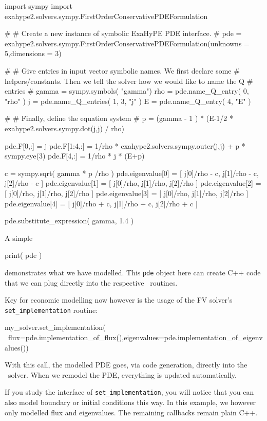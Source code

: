 \begin{code}
import sympy
import exahype2.solvers.sympy.FirstOrderConservativePDEFormulation


#
# Create a new instance of symbolic ExaHyPE PDE interface.
#
pde = exahype2.solvers.sympy.FirstOrderConservativePDEFormulation(unknowns = 5,dimensions = 3)

#
# Give entries in input vector symbolic names. We first declare some
# helpers/constants. Then we tell the solver how we would like to name the Q 
# entries
#
gamma = sympy.symbols( "gamma")
rho   = pde.name_Q_entry( 0, "rho" )
j     = pde.name_Q_entries( 1, 3, "j" )
E     = pde.name_Q_entry( 4, "E" )

#
# Finally, define the equation system
#
p = (gamma - 1 ) * (E-1/2 * exahype2.solvers.sympy.dot(j,j) / rho)

pde.F[0,:]   = j
pde.F[1:4,:] = 1/rho * exahype2.solvers.sympy.outer(j,j) + p * sympy.eye(3)
pde.F[4,:]   = 1/rho * j * (E+p)

c = sympy.sqrt( gamma * p /rho )
pde.eigenvalue[0] = [ j[0]/rho - c, j[1]/rho - c, j[2]/rho - c ]
pde.eigenvalue[1] = [ j[0]/rho, j[1]/rho, j[2]/rho ]
pde.eigenvalue[2] = [ j[0]/rho, j[1]/rho, j[2]/rho ]
pde.eigenvalue[3] = [ j[0]/rho, j[1]/rho, j[2]/rho ]
pde.eigenvalue[4] = [ j[0]/rho + c, j[1]/rho + c, j[2]/rho + c ]

pde.substitute_expression( gamma, 1.4 )
\end{code}


\noindent
A simple
\begin{code}
 print( pde )
\end{code}
demonstrates what we have modelled.
This \texttt{pde} object here can create C++ code that we can plug directly into
the respective \Peano\ routines.


Key for economic modelling now however is the usage of the FV solver's
\texttt{set\_implementation} routine:
\begin{code}
my_solver.set_implementation( \
  flux=pde.implementation_of_flux(),eigenvalues=pde.implementation_of_eigenvalues())
\end{code}

\noindent
With this call, the modelled PDE goes, via code generation, directly into the
\ExaHyPE\ solver. When we remodel the PDE, everything is updated automatically.


If you study the interface of \texttt{set\_implementation}, you will notice that
you can also model boundary or initial conditions this way.
In this example, we however only modelled flux and eigenvalues.
The remaining callbacks remain plain C++.


